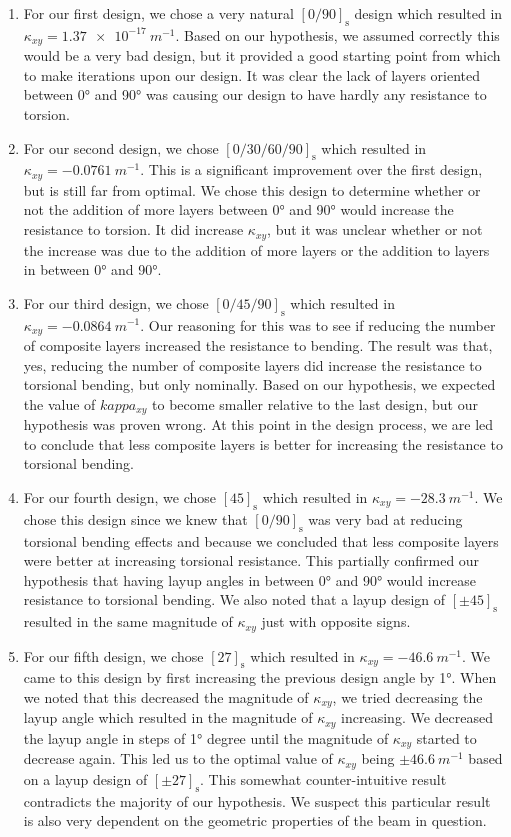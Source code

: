 \documentclass[12 pt]{article}
\begin{document}
\begin{enumerate}
	\item For our first design, we chose a very natural $[\num{0}/\num{90}]_\mathrm{s}$ design which resulted in $\kappa_{xy}=\qty{1.37e-17}{m^{-1}}$. Based on our hypothesis, we assumed correctly this would be a very bad design, but it provided a good starting point from which to make iterations upon our design. It was clear the lack of layers oriented between \ang{0} and \ang{90} was causing our design to have hardly any resistance to torsion.
	\item For our second design, we chose $[\num{0}/\num{30}/\num{60}/\num{90}]_\mathrm{s}$ which resulted in $\kappa_{xy}=\qty{-0.0761}{m^{-1}}$. This is a significant improvement over the first design, but is still far from optimal. We chose this design to determine whether or not the addition of more layers between \ang{0} and \ang{90} would increase the resistance to torsion. It did increase $\kappa_{xy}$, but it was unclear whether or not the increase was due to the addition of more layers or the addition to layers in between \ang{0} and \ang{90}.
	\item For our third design, we chose $[\num{0}/\num{45}/\num{90}]_\mathrm{s}$ which resulted in $\kappa_{xy}=\qty{-0.0864}{m^{-1}}$. Our reasoning for this was to see if reducing the number of composite layers increased the resistance to bending. The result was that, yes, reducing the number of composite layers did increase the resistance to torsional bending, but only nominally. Based on our hypothesis, we expected the value of $kappa_{xy}$ to become smaller relative to the last design, but our hypothesis was proven wrong. At this point in the design process, we are led to conclude that less composite layers is better for increasing the resistance to torsional bending.
	\item For our fourth design, we chose $[\num{45}]_\mathrm{s}$ which resulted in $\kappa_{xy}=\qty{-28.3}{m^{-1}}$. We chose this design since we knew that $[\num{0}/\num{90}]_\mathrm{s}$ was very bad at reducing torsional bending effects and because we concluded that less composite layers were better at increasing torsional resistance. This partially confirmed our hypothesis that having layup angles in between \ang{0} and \ang{90} would increase resistance to torsional bending. We also noted that a layup design of $[\pm\num{45}]_\mathrm{s}$ resulted in the same magnitude of $\kappa_{xy}$ just with opposite signs.
	\item For our fifth design, we chose $[\num{27}]_\mathrm{s}$ which resulted in $\kappa_{xy}=\qty{-46.6}{m^{-1}}$. We came to this design by first increasing the previous design angle by \ang{1}. When we noted that this decreased the magnitude of $\kappa_{xy}$, we tried decreasing the layup angle which resulted in the magnitude of $\kappa_{xy}$ increasing. We decreased the layup angle in steps of \ang{1} degree until the magnitude of $\kappa_{xy}$ started to decrease again. This led us to the optimal value of $\kappa_{xy}$ being $\pm\qty{46.6}{m^{-1}}$ based on a layup design of $[\pm\num{27}]_\mathrm{s}$. This somewhat counter-intuitive result contradicts the majority of our hypothesis. We suspect this particular result is also very dependent on the geometric properties of the beam in question.

\end{enumerate}
\end{document}
